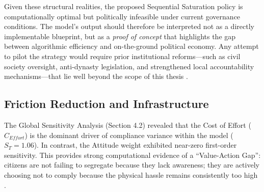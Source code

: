 Given these structural realities, the proposed Sequential Saturation policy is computationally optimal but politically infeasible under current governance conditions. The model’s output should therefore be interpreted not as a directly implementable blueprint, but as a \textit{proof of concept} that highlights the gap between algorithmic efficiency and on-the-ground political economy. Any attempt to pilot the strategy would require prior institutional reforms—such as civil society oversight, anti-dynasty legislation, and strengthened local accountability mechanisms—that lie well beyond the scope of this thesis \citep{Carpio2025a,IBON2026,Tribune2025,PIDS2024,PIDS2025a}.

\subsection{Friction Reduction and Infrastructure}
The Global Sensitivity Analysis (Section 4.2) revealed that the Cost of Effort ($C_{Effort}$) is the dominant driver of compliance variance within the model ($S_T=1.06$). In contrast, the Attitude weight exhibited near-zero first-order sensitivity. This provides strong computational evidence of a ``Value-Action Gap'': citizens are not failing to segregate because they lack awareness; they are actively choosing not to comply because the physical hassle remains consistently too high \citep{Yazawa2025, Zhao2022}.

